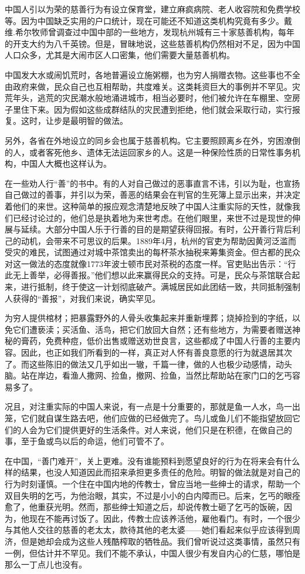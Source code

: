 \documentclass[12pt,oneside]{book}
\begin{document}
\begin{common-format}
中国人引以为荣的慈善行为有设立保育堂，建立麻疯病院、老人收容院和免费学校等。因为中国缺乏实用的户口统计，现在可能还不知道这类机构究竟有多少。戴维.希尔牧师曾调查过中国中部的一些地方，发现杭州城有三十家慈善机构，每年的开支大约为八千英镑。但是，冒昧地说，这些慈善机构仍然相对不足，因为中国人口众多，尤其是大闹市区人口密集，他们需要大量慈善机构。 

中国发大水或闹饥荒时，各地普遍设立施粥棚，也为穷人捐赠衣物。这些事也不全由政府来做，民众自己也互相帮助，共度难关。这类耗资巨大的事例并不罕见。灾荒年头，逃荒的灾民潮水般地涌进城市，相当必要时，他们被允许在车棚里、空房子里住下来。因为假如这些成群结队的灾民遭到拒绝，他们就会采取行动，实行报复。这时，让步是最明智的做法。 

另外，各省在外地设立的同乡会也属于慈善机构。它主要照顾离乡在外，穷困潦倒的人，或者客死他乡、遗体无法运回家乡的人。这是一种保险性质的日常性事务机构，中国人大概也这样认为。 

在一些劝人行“善”的书中。有的人对自己做过的恶事直言不讳，引以为耻，也宣扬自己做过的善事，并引以为荣，善恶的结果会在判官的生死簿上显示出来，并决定着他们的来世。这种简单的报应观念清楚地反映了中国人注重实际的天性，就像我们已经讨论过的，他们总是执着地为来世考虑。在他们眼里，来世不过是现世的伸展与延续。大部分中国人乐于行善的目的是期望获得回报。有时，公开善行背后利己的动机，会带来不可思议的后果。1889年4月，杭州的官吏为帮助因黄河泛滥而受灾的难民，试图通过对城中茶馆卖出的每杯茶水抽税来筹集资金。但古都的民众对这一做法的态度就像1773年波士顿市民对茶税的态度一样。官吏贴出告示：“行此无上善举，必得善报。”他们想以此来赢得民众的支持。可是，民众与茶馆联合起来，进行抵制，终于使这一计划彻底破产。满城居民如此团结一致，共同抵制强制人获得的“善报”，对我们来说，确实罕见。 

为穷人提供棺材；把暴露野外的人骨头收集起来并重新埋葬；烧掉捡到的字纸，以免它们遭亵渎；买活鱼、活鸟，把它们放回大自然；还有些地方，为需要者赠送神秘的膏药，免费种痘，低价出售或赠送劝世良言，这些都成了中国人行善的主要内容。因此，也正如我们所看到的一样，真正对人怀有善良意愿的行为就退居其次了。而这些陈旧的做法又几乎如出一辙，千篇一律，做的人也极少动感情，动头脑。站在岸边，看渔人撒网、捡鱼，撤网、捡鱼，当然比帮助站在家门口的乞丐容易多了。 

况且，对注重实际的中国人来说，有一点是十分重要的，那就是鱼一人水，鸟一出笼，它们就自谋生路去吧，他们应做的已经做完了。鸟儿或鱼儿们不能指望放回它们的人会为它们提供更好的生活条件。对人来说，他们只是在积德，在做自己的事，至于鱼或鸟以后的命运，他们可管不了。 

在中国，“善门难开”，关上更难。没有谁能预料到愿望良好的行为在将来会有什么样的结果，也没人知道因此而招来承担更多责任的危险。明智的做法就是对自己的行为时刻谨慎。一个住在中国内地的传教士，曾应当地一些绅士的请求，帮助一个双目失明的乞丐，为他治眼，其实，不过是小小的白内障而已。后来，乞丐的眼痊愈了，他重获光明。然而，那些绅士知道之后，却说传教士砸了乞丐的饭碗，因为，他现在不能再讨饭了。因此，传教士应该养活他，雇他看门。有时，一个很少与其他人交往的慈善的老太太，款待其他的老太婆——她们看起来似乎应该得到周济，但是她却会成为这些人残酷榨取的牺牲品。我们曾听说过这类事情，虽然只有一例，但估计并不罕见。我们不能不承认，中国人很少有发自内心的仁慈，哪怕是那么一丁点儿也没有。 


\end{common-format}
\end{document}
